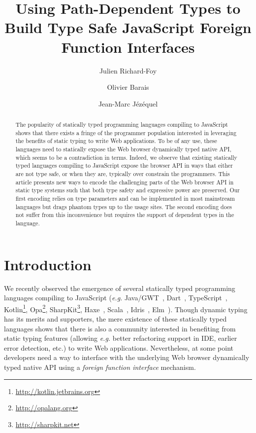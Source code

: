 \documentclass{llncs}
\begin{document}
\renewcommand{\thelstlisting}{\arabic{lstlisting}}

 \title{Using Path-Dependent Types to Build Type Safe JavaScript Foreign Function Interfaces}

 \author{Julien Richard-Foy \and Olivier Barais \and Jean-Marc J\'ez\'equel}



 \maketitle

\begin{abstract}
The popularity of statically typed programming languages compiling to JavaScript shows that there exists a fringe of the programmer population interested in leveraging the benefits of static typing to write Web applications. To be of any use, these languages need to statically expose the Web browser dynamically typed native API, which seems to be a contradiction in terms. Indeed, we observe that existing statically typed languages compiling to JavaScript expose the browser API in ways that either are not type safe, or when they are, typically over constrain the programmers. This article presents new ways to encode the challenging parts of the Web browser API in static type systems such that both type safety and expressive power are preserved. Our first encoding relies on type parameters and can be implemented in most mainstream languages but drags phantom types up to the usage sites. The second encoding does not suffer from this inconvenience but requires the support of dependent types in the language.
\end{abstract}

\section{Introduction}

We recently observed the emergence of several statically typed programming languages compiling to JavaScript (\emph{e.g.} Java/GWT~\cite{Kereki09_GWT}, Dart~\cite{Griffith11_Dart}, TypeScript~\cite{fenton2012typescript}, Kotlin\footnote{\href{http://kotlin.jetbrains.org}{http://kotlin.jetbrains.org}}, Opa\footnote{\href{http://opalang.org}{http://opalang.org}}, SharpKit\footnote{\href{http://sharpkit.net}{http://sharpkit.net}}, Haxe~\cite{Cannasse08_HaXe}, Scala~\cite{Doeraene13_ScalaJs}, Idris~\cite{Brady13_Idris}, Elm~\cite{czaplicki2012elm}). Though dynamic typing has its merits and supporters, the mere existence of these statically typed languages shows that there is also a community interested in benefiting from static typing features (allowing \emph{e.g.} better refactoring support in IDE, earlier error detection, etc.) to write Web applications. Nevertheless, at some point developers need a way to interface with the underlying Web browser dynamically typed native API using a \emph{foreign function 
interface} mechanism.
\end{document}
